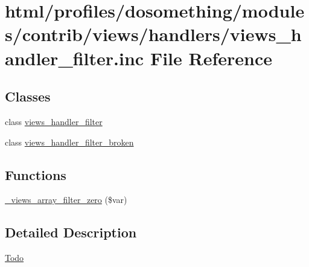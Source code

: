 \hypertarget{views__handler__filter_8inc}{
\section{html/profiles/dosomething/modules/contrib/views/handlers/views\_\-handler\_\-filter.inc File Reference}
\label{views__handler__filter_8inc}
}
\subsection*{Classes}
\begin{DoxyCompactItemize}
\item 
class \hyperlink{classviews__handler__filter}{views\_\-handler\_\-filter}
\item 
class \hyperlink{classviews__handler__filter__broken}{views\_\-handler\_\-filter\_\-broken}
\end{DoxyCompactItemize}
\subsection*{Functions}
\begin{DoxyCompactItemize}
\item 
\hyperlink{group__views__filter__handlers_ga4877cb7e6a7e3cda21438608fa979cbb}{\_\-views\_\-array\_\-filter\_\-zero} (\$var)
\end{DoxyCompactItemize}


\subsection{Detailed Description}
\begin{Desc}
\item[\hyperlink{todo__todo000074}{Todo}]\end{Desc}
